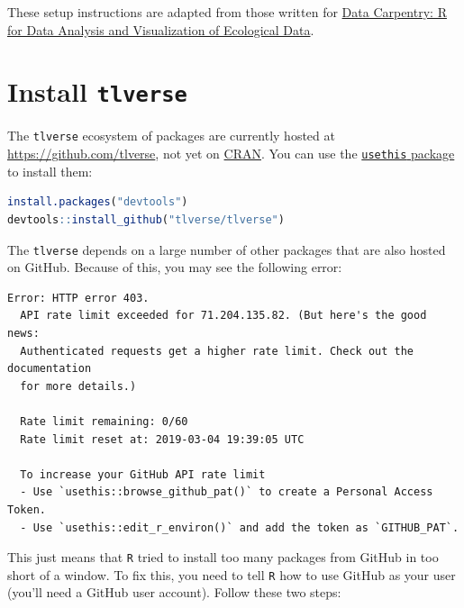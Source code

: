 \documentclass[
  12pt, krantz2,
]{krantz}
\newcommand{\passthrough}[1]{#1}
\newcommand{\1}{\mathbbm{1}}
\theoremstyle{definition}
\theoremstyle{definition}
\theoremstyle{definition}
\theoremstyle{definition}
\theoremstyle{remark}
\begin{document}
These setup instructions are adapted from those written for \href{http://www.datacarpentry.org/R-ecology-lesson/}{Data Carpentry: R
for Data Analysis and Visualization of Ecological
Data}.

\hypertarget{installtlverse}{%
\section{\texorpdfstring{Install \texttt{tlverse}}{Install tlverse}}\label{installtlverse}}

The \passthrough{\lstinline!tlverse!} ecosystem of packages are currently hosted at
\url{https://github.com/tlverse}, not yet on \href{https://CRAN.R-project.org/}{CRAN}. You
can use the \href{https://usethis.r-lib.org/}{\passthrough{\lstinline!usethis!} package} to install them:

\begin{lstlisting}[language=R]
install.packages("devtools")
devtools::install_github("tlverse/tlverse")
\end{lstlisting}

The \passthrough{\lstinline!tlverse!} depends on a large number of other packages that are also hosted
on GitHub. Because of this, you may see the following error:

\begin{lstlisting}
Error: HTTP error 403.
  API rate limit exceeded for 71.204.135.82. (But here's the good news:
  Authenticated requests get a higher rate limit. Check out the documentation
  for more details.)

  Rate limit remaining: 0/60
  Rate limit reset at: 2019-03-04 19:39:05 UTC

  To increase your GitHub API rate limit
  - Use `usethis::browse_github_pat()` to create a Personal Access Token.
  - Use `usethis::edit_r_environ()` and add the token as `GITHUB_PAT`.
\end{lstlisting}

This just means that \passthrough{\lstinline!R!} tried to install too many packages from GitHub in too
short of a window. To fix this, you need to tell \passthrough{\lstinline!R!} how to use GitHub as your
user (you'll need a GitHub user account). Follow these two steps:
\end{document}
